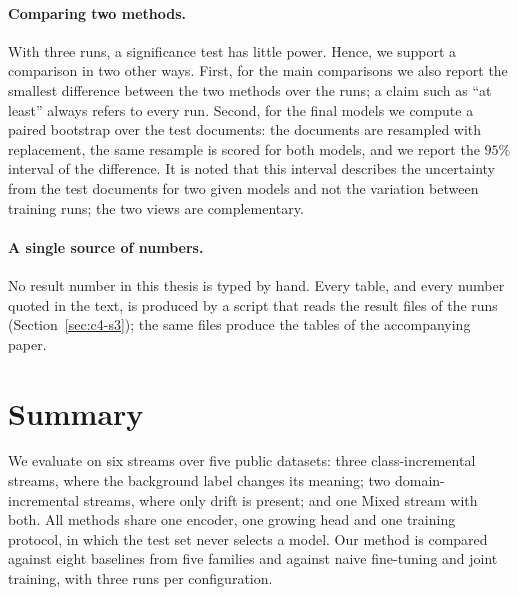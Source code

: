 \paragraph{Comparing two methods.} With three runs, a significance test has little power.
Hence, we support a comparison in two other ways. First, for the main comparisons we also
report the smallest difference between the two methods over the runs; a claim such as ``at
least'' always refers to every run. Second, for the final models we compute a paired
bootstrap over the test documents: the documents are resampled with replacement, the same
resample is scored for both models, and we report the $95\%$ interval of the difference. It
is noted that this interval describes the uncertainty from the test documents for two given
models and not the variation between training runs; the two views are complementary.

\paragraph{A single source of numbers.} No result number in this thesis is typed by hand.
Every table, and every number quoted in the text, is produced by a script that reads the
result files of the runs (Section~\ref{sec:c4-s3}); the same files produce the tables of the
accompanying paper.

\section{Summary}
\label{sec:e-summary}

We evaluate on six streams over five public datasets: three class-incremental streams,
where the background label changes its meaning; two domain-incremental streams, where only
drift is present; and one Mixed stream with both. All methods share one encoder, one
growing head and one training protocol, in which the test set never selects a model. Our
method is compared against eight baselines from five families and against naive
fine-tuning and joint training, with three runs per configuration.
